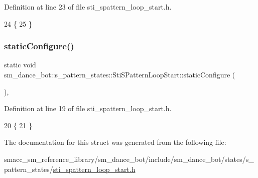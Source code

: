 Definition at line 23 of file sti\+\_\+spattern\+\_\+loop\+\_\+start.\+h.


\begin{DoxyCode}
24   \{
25   \}
\end{DoxyCode}
\mbox{\label{structsm__dance__bot_1_1s__pattern__states_1_1StiSPatternLoopStart_acba33a7e0bd20035d4591b66fa1b4364}} 
\subsubsection{\texorpdfstring{static\+Configure()}{staticConfigure()}}
{\footnotesize\ttfamily static void sm\+\_\+dance\+\_\+bot\+::s\+\_\+pattern\+\_\+states\+::\+Sti\+S\+Pattern\+Loop\+Start\+::static\+Configure (\begin{DoxyParamCaption}{ }\end{DoxyParamCaption})\hspace{0.3cm}{\ttfamily [inline]}, {\ttfamily [static]}}



Definition at line 19 of file sti\+\_\+spattern\+\_\+loop\+\_\+start.\+h.


\begin{DoxyCode}
20   \{
21   \}
\end{DoxyCode}


The documentation for this struct was generated from the following file\+:\begin{DoxyCompactItemize}
\item 
smacc\+\_\+sm\+\_\+reference\+\_\+library/sm\+\_\+dance\+\_\+bot/include/sm\+\_\+dance\+\_\+bot/states/s\+\_\+pattern\+\_\+states/\hyperlink{include_2sm__dance__bot_2states_2s__pattern__states_2sti__spattern__loop__start_8h}{sti\+\_\+spattern\+\_\+loop\+\_\+start.\+h}\end{DoxyCompactItemize}
